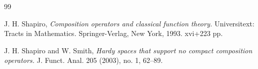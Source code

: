 \documentclass[11pt]{amsart}%
\theoremstyle{definition}
\theoremstyle{remark}
\numberwithin{equation}{section}
\begin{document}
\begin{thebibliography}{99}


J. H. Shapiro, \emph{Composition operators and
classical function theory.} Universitext: Tracts in Mathematics.
Springer-Verlag, New York, 1993. xvi+223 pp.

J. H. Shapiro and W. Smith, \emph{Hardy spaces that
support no compact composition operators.} J. Funct. Anal. 205 (2003), no. 1,
62--89.





\end{thebibliography}

\end{document}
